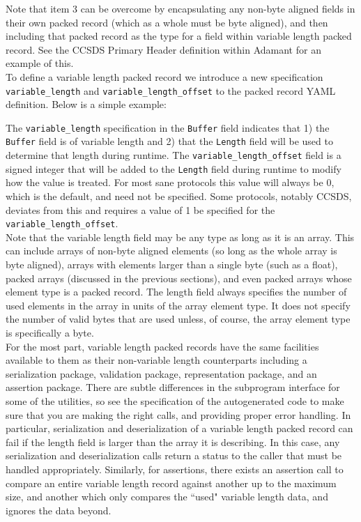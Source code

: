 Note that item 3 can be overcome by encapsulating any non-byte aligned fields in their own packed record (which as a whole must be byte aligned), and then including that packed record as the type for a field within variable length packed record. See the CCSDS Primary Header definition within Adamant for an example of this. \\

To define a variable length packed record we introduce a new specification \texttt{variable\_length} and \texttt{variable\_length\_offset} to the packed record YAML definition. Below is a simple example:


The \texttt{variable\_length} specification in the \texttt{Buffer} field indicates that 1) the \texttt{Buffer} field is of variable length and 2) that the \texttt{Length} field will be used to determine that length during runtime. The \texttt{variable\_length\_offset} field is a signed integer that will be added to the \texttt{Length} field during runtime to modify how the value is treated. For most sane protocols this value will always be 0, which is the default, and need not be specified. Some protocols, notably CCSDS, deviates from this and requires a value of 1 be specified for the \texttt{variable\_length\_offset}. \\

Note that the variable length field may be any type as long as it is an array. This can include arrays of non-byte aligned elements (so long as the whole array is byte aligned), arrays with elements larger than a single byte (such as a float), packed arrays (discussed in the previous sections), and even packed arrays whose element type is a packed record. The length field always specifies the number of used elements in the array in units of the array element type. It does not specify the number of valid bytes that are used unless, of course, the array element type is specifically a byte. \\

For the most part, variable length packed records have the same facilities available to them as their non-variable length counterparts including a serialization package, validation package, representation package, and an assertion package. There are subtle differences in the subprogram interface for some of the utilities, so see the specification of the autogenerated code to make sure that you are making the right calls, and providing proper error handling. In particular, serialization and deserialization of a variable length packed record can fail if the length field is larger than the array it is describing. In this case, any serialization and deserialization calls return a status to the caller that must be handled appropriately. Similarly, for assertions, there exists an assertion call to compare an entire variable length record against another up to the maximum size, and another which only compares the ``used" variable length data, and ignores the data beyond.

